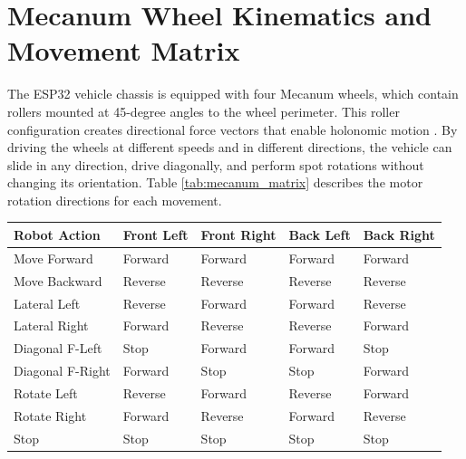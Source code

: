 \documentclass[12pt,a4paper,oneside]{report}
\begin{document}
\section{Mecanum Wheel Kinematics and Movement Matrix}
The ESP32 vehicle chassis is equipped with four Mecanum wheels, which contain rollers mounted at 45-degree angles to the wheel perimeter. This roller configuration creates directional force vectors that enable holonomic motion \cite{robotics_ref}. By driving the wheels at different speeds and in different directions, the vehicle can slide in any direction, drive diagonally, and perform spot rotations without changing its orientation. Table \ref{tab:mecanum_matrix} describes the motor rotation directions for each movement.\par
\vspace{0.1in}
\begin{center}
\fontsize{9.0}{11}\selectfont
\begin{tabular}{|C{2.7cm}|C{2.7cm}|C{2.7cm}|C{2.7cm}|C{2.7cm}|}
\hline
\textbf{Robot Action} & \textbf{Front Left} & \textbf{Front Right} & \textbf{Back Left} & \textbf{Back Right} \\ \hline
Move Forward & Forward & Forward & Forward & Forward \\ \hline
Move Backward & Reverse & Reverse & Reverse & Reverse \\ \hline
Lateral Left & Reverse & Forward & Forward & Reverse \\ \hline
Lateral Right & Forward & Reverse & Reverse & Forward \\ \hline
Diagonal F-Left & Stop & Forward & Forward & Stop \\ \hline
Diagonal F-Right & Forward & Stop & Stop & Forward \\ \hline
Rotate Left & Reverse & Forward & Reverse & Forward \\ \hline
Rotate Right & Forward & Reverse & Forward & Reverse \\ \hline
Stop & Stop & Stop & Stop & Stop \\ \hline
\end{tabular}
\vspace{0.05in}
\label{tab:mecanum_matrix}
\end{center}
\newpage
\end{document}
